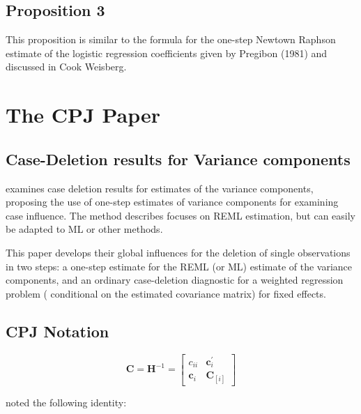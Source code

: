 \documentclass[Chap5amain.tex]{subfiles}
\begin{document}
\subsection{Proposition 3}
This proposition is similar to the formula for the one-step Newtown Raphson estimate of the logistic regression coefficients given by Pregibon (1981) and discussed in Cook Weisberg.


\newpage
\section{The CPJ Paper}%

\subsection{Case-Deletion results for Variance components}
\citet{CPJ} examines case deletion results for estimates of the variance components, proposing the use of one-step estimates of variance components for examining case influence. The method describes focuses on REML estimation, but can easily be adapted to ML or other methods.

This paper develops their global influences for the deletion of single observations in two steps: a one-step estimate for the REML (or ML) estimate of the variance components, and an ordinary case-deletion diagnostic for a weighted regression problem ( conditional on the estimated covariance matrix) for fixed effects.


\subsection{CPJ Notation} %

\[ \boldsymbol{C} = \boldsymbol{H}^{-1} = \left[
\begin{array}{cc}
c_{ii} & \boldsymbol{c}_{i}^{\prime}\\
\boldsymbol{c}_{i} &  \boldsymbol{C}_{[i]}
\end{array} \right]
\]

\citet{CPJ} noted the following identity:
\end{document}
